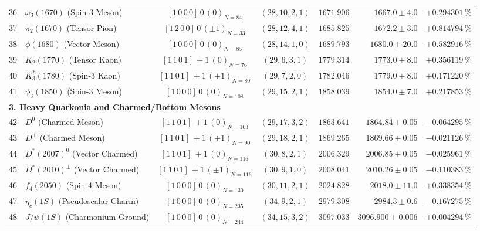 \documentclass[
    12pt,
    a4paper,
    headings=normal,
    twoside=false,
    open=any,
    parskip=half
]{scrbook}
\begin{document}
\begin{longtable}{clccrrr}
36 & $\omega_3(1670)$ (Spin-3 Meson) & $[1 \, 0 \, 0 \, 0] \, 0 \, (0)_{N=84}$ & $(28, 10, 2, 1)$ & $1671.906$ & $1667.0 \pm 4.0$ & $+0.294301\,\%$ \\
37 & $\pi_2(1670)$ (Tensor Pion) & $[1 \, 2 \, 0 \, 0] \, 0 \, (\pm 1)_{N=33}$ & $(28, 12, 4, 1)$ & $1685.825$ & $1672.2 \pm 3.0$ & $+0.814794\,\%$ \\
38 & $\phi(1680)$ (Vector Meson) & $[1 \, 0 \, 0 \, 0] \, 0 \, (0)_{N=85}$ & $(28, 14, 1, 0)$ & $1689.793$ & $1680.0 \pm 20.0$ & $+0.582916\,\%$ \\
39 & $K_2(1770)$ (Tensor Kaon) & $[1 \, 1 \, 0 \, 1] \, +1 \, (0)_{N=76}$ & $(29, 6, 3, 1)$ & $1779.314$ & $1773.0 \pm 8.0$ & $+0.356119\,\%$ \\
40 & $K_3^*(1780)$ (Spin-3 Kaon) & $[1 \, 1 \, 0 \, 1] \, +1 \, (\pm 1)_{N=80}$ & $(29, 7, 2, 0)$ & $1782.046$ & $1779.0 \pm 8.0$ & $+0.171220\,\%$ \\
41 & $\phi_3(1850)$ (Spin-3 Meson) & $[1 \, 0 \, 0 \, 0] \, 0 \, (0)_{N=108}$ & $(29, 15, 2, 1)$ & $1858.039$ & $1854.0 \pm 7.0$ & $+0.217853\,\%$ \\\midrule
\multicolumn{7}{l}{\textsf{\textbf{\color{maincolor!90!black}3. Heavy Quarkonia and Charmed/Bottom Mesons}}} \\\midrule
42 & $D^0$ (Charmed Meson) & $[1 \, 1 \, 0 \, 1] \, +1 \, (0)_{N=103}$ & $(29, 17, 3, 2)$ & $1863.641$ & $1864.84 \pm 0.05$ & $-0.064295\,\%$ \\
43 & $D^\pm$ (Charmed Meson) & $[1 \, 1 \, 0 \, 1] \, +1 \, (\pm 1)_{N=90}$ & $(29, 18, 2, 1)$ & $1869.265$ & $1869.66 \pm 0.05$ & $-0.021126\,\%$ \\
44 & $D^*(2007)^0$ (Vector Charmed) & $[1 \, 1 \, 0 \, 1] \, +1 \, (0)_{N=116}$ & $(30, 8, 2, 1)$ & $2006.329$ & $2006.85 \pm 0.05$ & $-0.025961\,\%$ \\
45 & $D^*(2010)^\pm$ (Vector Charmed) & $[1 \, 1 \, 0 \, 1] \, +1 \, (\pm 1)_{N=116}$ & $(30, 9, 1, 0)$ & $2008.041$ & $2010.26 \pm 0.05$ & $-0.110383\,\%$ \\
46 & $f_4(2050)$ (Spin-4 Meson) & $[1 \, 0 \, 0 \, 0] \, 0 \, (0)_{N=130}$ & $(30, 11, 2, 1)$ & $2024.828$ & $2018.0 \pm 11.0$ & $+0.338354\,\%$ \\
47 & $\eta_c(1S)$ (Pseudoscalar Charm) & $[1 \, 0 \, 0 \, 0] \, 0 \, (0)_{N=235}$ & $(34, 9, 2, 1)$ & $2979.308$ & $2984.3 \pm 0.6$ & $-0.167275\,\%$ \\
48 & $J/\psi(1S)$ (Charmonium Ground) & $[1 \, 0 \, 0 \, 0] \, 0 \, (0)_{N=244}$ & $(34, 15, 3, 2)$ & $3097.033$ & $3096.900 \pm 0.006$ & $+0.004294\,\%$ \\

\end{longtable}
\end{document}
